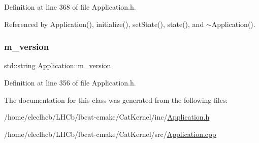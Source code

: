 Definition at line 368 of file Application.\+h.



Referenced by Application(), initialize(), set\+State(), state(), and $\sim$\+Application().

\mbox{\label{classApplication_acbbdbd17a3a66782c54dbbe58a9ca8d8}} 
\subsubsection{\texorpdfstring{m\+\_\+version}{m\_version}}
{\footnotesize\ttfamily std\+::string Application\+::m\+\_\+version\hspace{0.3cm}{\ttfamily [protected]}}



Definition at line 356 of file Application.\+h.



The documentation for this class was generated from the following files\+:\begin{DoxyCompactItemize}
\item 
/home/eleclhcb/\+L\+H\+Cb/lbcat-\/cmake/\+Cat\+Kernel/inc/\hyperlink{Application_8h}{Application.\+h}\item 
/home/eleclhcb/\+L\+H\+Cb/lbcat-\/cmake/\+Cat\+Kernel/src/\hyperlink{Application_8cpp}{Application.\+cpp}\end{DoxyCompactItemize}
